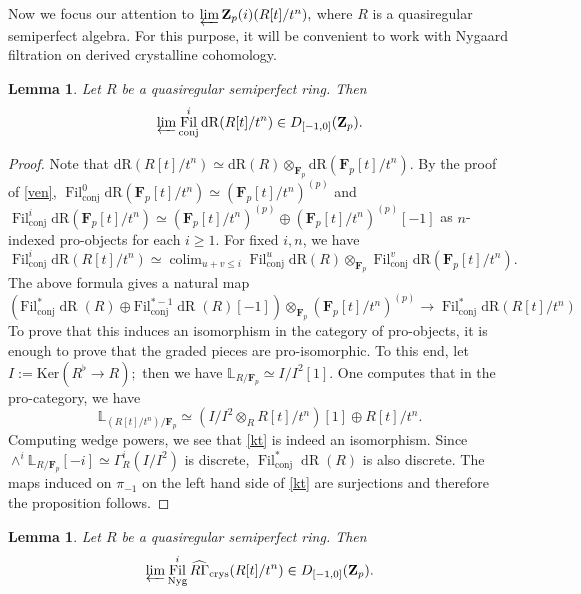\documentclass[10pt,letterpaper]{amsart}
\newcommand{\stodo}[1]{{\todo[size = \tiny]{#1}}}
\numberwithin{figure}{section}
\numberwithin{equation}{section}
\newtheorem{lemma}[figure]{Lemma}
\theoremstyle{definition}
\theoremstyle{definition}
\theoremstyle{definition}
\theoremstyle{definition}
\DeclareMathOperator*{\colim}{colim}
\DeclareMathOperator{\conj}{conj}
\DeclareMathOperator{\Fil}{Fil}
\DeclareMathOperator{\dR}{dR}
\newcommand{\LL}{\L}
\renewcommand{\L}{\mathbb{L}}
\newcommand{\Z}{\mathbf{Z}}
\newcommand{\F}{\mathbf{F}}
\begin{document}
Now we focus our attention to $\varprojlim \Z_p(i) (R[t]/t^n),$ where $R$ is a quasiregular semiperfect algebra. For this purpose, it will be convenient to work with Nygaard filtration on derived crystalline cohomology. 




\begin{lemma}
     Let $R$ be a quasiregular semiperfect ring. Then $$ \varprojlim \Fil^{i}_{\conj}\mathrm{dR} (R[t]/t^n)\in D_{[-1,0]} (\Z_p).$$
 
\end{lemma}{}

\begin{proof}
    Note that $\mathrm{dR} (R[t]/t^n) \simeq \mathrm{dR}(R) \otimes_{\F_p} \mathrm{dR} (\F_p [t]/t^n).$ By the proof of \cref{ven}, $\Fil^0_{\conj} \mathrm{dR}(\F_p [t]/t^n) \simeq  (\F_p [t]/t^n)^{(p)}$ and $\Fil^i_{\conj} \mathrm{dR}(\F_p [t]/t^n) \simeq  (\F_p [t]/t^n)^{(p)} \oplus (\F_p [t]/t^n)^{(p)}[-1]$ as $n$-indexed pro-objects for each $i \ge 1$. For fixed $i,n$, we have
$$\Fil^i_{\conj}\mathrm{dR}(R[t]/t^n) \simeq \colim_{u+v \le i} \Fil^u_{\conj} \mathrm{dR}(R) \otimes_{\F_p}\Fil^v_{\conj}   \mathrm{dR}(\F_p [t]/t^n).$$
The above formula gives a natural map
\begin{equation}\label{kt}
    \left( \mathrm{Fil}^*_{\conj} \dR(R) \oplus \mathrm{Fil}^{*-1}_{\conj} \dR(R) [-1] \right) \otimes_{\F_p} (\F_p[t] /t^n)^{(p)} \to \Fil^*_{\conj}\mathrm{dR}(R[t]/t^n)
\end{equation}
To prove that this induces an isomorphism in the category of pro-objects, it is enough to prove that the graded pieces are pro-isomorphic. To this end, let $I:= \mathrm{Ker}(R^\flat \to R);$ then we have $\L_{R/ \F_p} \simeq I/I^2 [1].$ One computes that in the pro-category, we have $$\L_{(R[t]/t^n)/\F_p} \simeq (I/I^2 \otimes_R R[t]/t^n)[1] \oplus R[t]/t^n.$$ Computing wedge powers, we see that \cref{kt} is indeed an isomorphism. Since $\wedge^i \LL_{R/\F_p}[-i] \simeq \Gamma ^i_R (I/I^2)$ is discrete, $\Fil^*_{\conj} \dR(R)$ is also discrete. The maps induced on $\pi_{-1}$ on the left hand side of \cref{kt} are surjections and therefore the proposition follows. 
\end{proof}{}



\begin{lemma}\label{ktt}
    Let $R$ be a quasiregular semiperfect ring. Then $$ \varprojlim\Fil_{\mathrm{Nyg}}^{i} \widehat{R\Gamma}_{\mathrm{crys}}(R[t]/t^n) \in D_{[-1,0]} (\Z_p).$$
\end{lemma}{}
\end{document}
